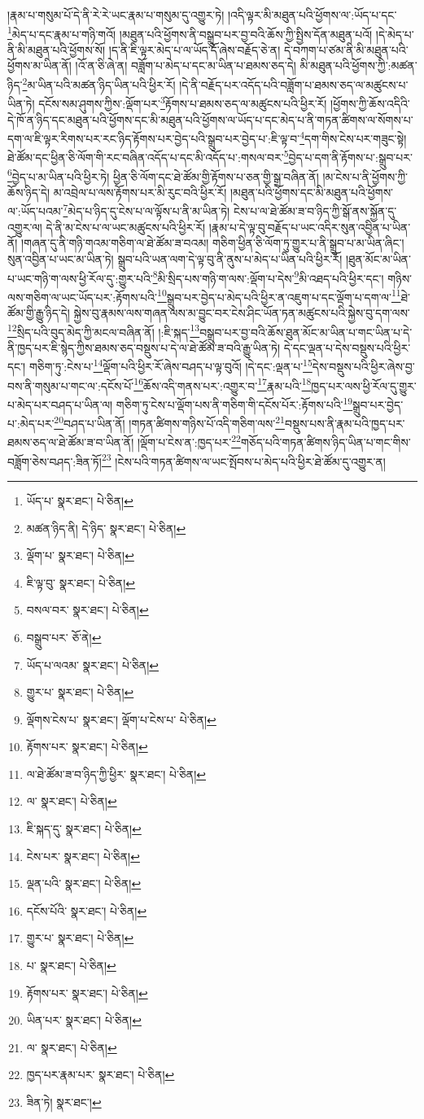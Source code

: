 །རྣམ་པ་གསུམ་པོ་དེ་ནི་རེ་རེ་ཡང་རྣམ་པ་གསུམ་དུ་འགྱུར་ཏེ། །འདི་ལྟར་མི་མཐུན་པའི་ཕྱོགས་ལ་:ཡོད་པ་དང་\footnote{ཡོད་པ་  སྣར་ཐང་།  པེ་ཅིན། }མེད་པ་དང་རྣམ་པ་གཉི་གའོ། །མཐུན་པའི་ཕྱོགས་ནི་བསྒྲུབ་པར་བྱ་བའི་ཆོས་ཀྱི་སྤྱིས་དོན་མཐུན་པའོ། །དེ་མེད་པ་ནི་མི་མཐུན་པའི་ཕྱོགས་སོ། །ད་ནི་ཇི་ལྟར་མེད་པ་ལ་ཡོད་དོ་ཞེས་བརྗོད་ཅེ་ན། དེ་བཀག་པ་ཙམ་ནི་མི་མཐུན་པའི་ཕྱོགས་མ་ཡིན་ནོ། །འོ་ན་ཅི་ཞེ་ན། བཟློག་པ་མེད་པ་དང་མ་ཡིན་པ་ཐམས་ཅད་དེ། མི་མཐུན་པའི་ཕྱོགས་ཀྱི་:མཚན་ཉིད་\footnote{མཚན་ཉིད་ནི། དེ་ཉིད་  སྣར་ཐང་།  པེ་ཅིན། }མ་ཡིན་པའི་མཚན་ཉིད་ཡིན་པའི་ཕྱིར་རོ། །དེ་ནི་བརྗོད་པར་འདོད་པའི་བཟློག་པ་ཐམས་ཅད་ལ་མཚུངས་པ་ཡིན་ཏེ། དངོས་སམ་ཤུགས་ཀྱིས་:ལྡོག་པར་\footnote{ལྡོག་པ་  སྣར་ཐང་།  པེ་ཅིན། }རྟོགས་པ་ཐམས་ཅད་ལ་མཚུངས་པའི་ཕྱིར་རོ། །ཕྱོགས་ཀྱི་ཆོས་འདིའི་དེ་ཁོ་ན་ཉིད་དང་མཐུན་པའི་ཕྱོགས་དང་མི་མཐུན་པའི་ཕྱོགས་ལ་ཡོད་པ་དང་མེད་པ་ནི་གཏན་ཚིགས་ལ་སོགས་པ་དག་ལ་ཇི་ལྟར་རིགས་པར་རང་ཉིད་རྟོགས་པར་བྱེད་པའི་སྒྲུབ་པར་བྱེད་པ་:ཇི་ལྟ་བ་\footnote{ཇི་ལྟ་བུ་  སྣར་ཐང་།  པེ་ཅིན། }དག་གིས་ངེས་པར་གཟུང་སྟེ། ཐེ་ཚོམ་དང་ཕྱིན་ཅི་ལོག་གི་རང་བཞིན་འདོད་པ་དང་མི་འདོད་པ་:གསལ་བར་\footnote{བསལ་བར་  སྣར་ཐང་།  པེ་ཅིན། }བྱེད་པ་དག་ནི་རྟོགས་པ་:སྒྲུབ་པར་\footnote{བསྒྲུབ་པར་  ཅོ་ནེ། }བྱེད་པ་མ་ཡིན་པའི་ཕྱིར་ཏེ། ཕྱིན་ཅི་ལོག་དང་ཐེ་ཚོམ་གྱི་རྟོགས་པ་ཅན་གྱི་སྒྲ་བཞིན་ནོ། །མ་ངེས་པ་ནི་ཕྱོགས་ཀྱི་ཆོས་ཉིད་དེ། མ་འབྲེལ་པ་ལས་རྟོགས་པར་མི་རུང་བའི་ཕྱིར་རོ། །མཐུན་པའི་ཕྱོགས་དང་མི་མཐུན་པའི་ཕྱོགས་ལ་:ཡོད་པའམ་\footnote{ཡོད་པ་ལའམ་  སྣར་ཐང་།  པེ་ཅིན། }མེད་པ་ཉིད་དུ་ངེས་པ་ལ་ལྟོས་པ་ནི་མ་ཡིན་ཏེ། ངེས་པ་ལ་ཐེ་ཚོམ་ཟ་བ་ཉིད་ཀྱི་སྒོ་ནས་སྐྱོན་དུ་འགྱུར་ལ། དེ་ནི་མ་ངེས་པ་ལ་ཡང་མཚུངས་པའི་ཕྱིར་རོ། །རྣམ་པ་དེ་ལྟ་བུ་བརྗོད་པ་ཡང་འདིར་སུན་འབྱིན་པ་ཡིན་ནོ། །གཞན་དུ་ནི་གཉི་གའམ་གཅིག་ལ་ཐེ་ཚོམ་ཟ་བའམ། གཅིག་ཕྱིན་ཅི་ལོག་ཏུ་གྱུར་པ་ནི་སྒྲུབ་པ་མ་ཡིན་ཞིང་། སུན་འབྱིན་པ་ཡང་མ་ཡིན་ཏེ། སྒྲུབ་པའི་ཡན་ལག་དེ་ལྟ་བུ་ནི་ནུས་པ་མེད་པ་ཡིན་པའི་ཕྱིར་རོ། །ཐུན་མོང་མ་ཡིན་པ་ཡང་གཉི་ག་ལས་ཕྱི་རོལ་དུ་:གྱུར་པའི་\footnote{གྱུར་པ་  སྣར་ཐང་།  པེ་ཅིན། }མི་སྲིད་པས་གཉི་ག་ལས་:ལྡོག་པ་དེས་\footnote{ལྡོགས་ངེས་པ་  སྣར་ཐང་། ལྡོག་པ་ངེས་པ་  པེ་ཅིན། }མི་འཐད་པའི་ཕྱིར་དང་། གཉིས་ལས་གཅིག་ལ་ཡང་ཡོད་པར་:རྟོགས་པའི་\footnote{རྟོགས་པར་  སྣར་ཐང་།  པེ་ཅིན། }སྒྲུབ་པར་བྱེད་པ་མེད་པའི་ཕྱིར་ན་འཇུག་པ་དང་ལྡོག་པ་དག་ལ་\footnote{ལ་ཐེ་ཚོམ་ཟ་བ་ཉིད་ཀྱི་ཕྱིར་  སྣར་ཐང་།  པེ་ཅིན། }ཐེ་ཚོམ་གྱི་རྒྱུ་ཉིད་དེ། སྐྱེས་བུ་རྣམས་ལས་གཞན་ལས་མ་བྱུང་བར་ངེས་ཤིང་ཡོན་ཏན་མཚུངས་པའི་སྐྱེས་བུ་དག་ལས་\footnote{ལ་  སྣར་ཐང་།  པེ་ཅིན། }སྲིད་པའི་བུད་མེད་ཀྱི་མངལ་བཞིན་ནོ། །:ཇི་སྐད་\footnote{ཇི་སྐད་དུ་  སྣར་ཐང་།  པེ་ཅིན། }བསྒྲུབ་པར་བྱ་བའི་ཆོས་ཐུན་མོང་མ་ཡིན་པ་གང་ཡིན་པ་དེ་ནི་ཁྱད་པར་ཇི་སྙེད་ཀྱིས་ཐམས་ཅད་བསྡུས་པ་དེ་ལ་ཐེ་ཚོམ་ཟ་བའི་རྒྱུ་ཡིན་ཏེ། དེ་དང་ལྡན་པ་དེས་བསྡུས་པའི་ཕྱིར་དང་། གཅིག་ཏུ་:ངེས་པ་\footnote{ངེས་པར་  སྣར་ཐང་།  པེ་ཅིན། }ལྡོག་པའི་ཕྱིར་རོ་ཞེས་བཤད་པ་ལྟ་བུའོ། །དེ་དང་:ལྡན་པ་\footnote{ལྡན་པའི་  སྣར་ཐང་།  པེ་ཅིན། }དེས་བསྡུས་པའི་ཕྱིར་ཞེས་བྱ་བས་ནི་གསུམ་པ་གང་ལ་:དངོས་པོ་\footnote{དངོས་པོའི་  སྣར་ཐང་།  པེ་ཅིན། }ཆོས་འདི་གནས་པར་:འགྱུར་བ་\footnote{གྱུར་པ་  སྣར་ཐང་།  པེ་ཅིན། }རྣམ་པའི་\footnote{པ་  སྣར་ཐང་།  པེ་ཅིན། }ཁྱད་པར་ལས་ཕྱི་རོལ་དུ་གྱུར་པ་མེད་པར་བཤད་པ་ཡིན་ལ། གཅིག་ཏུ་ངེས་པ་ལྡོག་པས་ནི་གཅིག་གི་དངོས་པོར་:རྟོགས་པའི་\footnote{རྟོགས་པར་  སྣར་ཐང་།  པེ་ཅིན། }སྒྲུབ་པར་བྱེད་པ་:མེད་པར་\footnote{ཡིན་པར་  སྣར་ཐང་།  པེ་ཅིན། }བཤད་པ་ཡིན་ནོ། །གཏན་ཚིགས་གཉིས་པོ་འདི་གཅིག་ལས་\footnote{ལ་  སྣར་ཐང་།  པེ་ཅིན། }བསྡུས་པས་ནི་རྣམ་པའི་ཁྱད་པར་ཐམས་ཅད་ལ་ཐེ་ཚོམ་ཟ་བ་ཡིན་ནོ། །ལྡོག་པ་ངེས་ན་:ཁྱད་པར་\footnote{ཁྱད་པར་རྣམ་པར་  སྣར་ཐང་།  པེ་ཅིན། }གཅོད་པའི་གཏན་ཚིགས་ཉིད་ཡིན་པ་གང་གིས་བཟློག་ཅེས་བཤད་:ཟིན་ཏོ།\footnote{ཟིན་ཏེ།  སྣར་ཐང་། } །ངེས་པའི་གཏན་ཚིགས་ལ་ཡང་སྤོབས་པ་མེད་པའི་ཕྱིར་ཐེ་ཚོམ་དུ་འགྱུར་ན། 